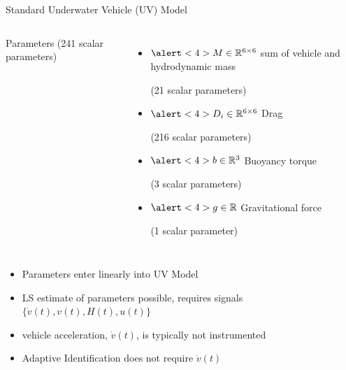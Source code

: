 \begin{frame}[t]{Standard Underwater Vehicle (UV) Model}
{\begin{columns}


      

     \pause 
     \alert<4>{Parameters} (241 scalar parameters)
      \begin{itemize}
      \item
        ${\alert<4> M}\in \mathbb{R}^{6\times 6}$ sum of vehicle and
        hydrodynamic mass 
        
        (21 scalar parameters)
      \item
        $\alert<4>{D_i}\in \mathbb{R}^{6\times 6}$ Drag 
        
        (216 scalar parameters)  
      \item
        ${\alert<4> b}\in \mathbb{R}^{3}$ Buoyancy torque 
        
        (3 scalar parameters)
      \item
        ${\alert<4> g}\in \mathbb{R}$ Gravitational force 
        
        
        (1 scalar parameter)
      \end{itemize}

    \end{columns} 
  }
  {
    \begin{itemize}
    \item<5-> Parameters enter linearly into UV Model
    \item<6-> LS estimate of parameters possible, requires signals 
      $\{\dot{v}(t),v(t),H(t),u(t)\}$
    \item<7-> vehicle acceleration, $\dot{v}(t)$, is typically not instrumented  
    \item<8-> Adaptive Identification does not require $\dot{v}(t)$
    \end{itemize}
  }

\end{frame}





